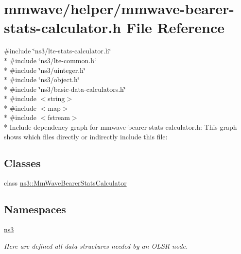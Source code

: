 \hypertarget{mmwave-bearer-stats-calculator_8h}{}\section{mmwave/helper/mmwave-\/bearer-\/stats-\/calculator.h File Reference}
\label{mmwave-bearer-stats-calculator_8h}
{\ttfamily \#include \char`\"{}ns3/lte-\/stats-\/calculator.\+h\char`\"{}}\\*
{\ttfamily \#include \char`\"{}ns3/lte-\/common.\+h\char`\"{}}\\*
{\ttfamily \#include \char`\"{}ns3/uinteger.\+h\char`\"{}}\\*
{\ttfamily \#include \char`\"{}ns3/object.\+h\char`\"{}}\\*
{\ttfamily \#include \char`\"{}ns3/basic-\/data-\/calculators.\+h\char`\"{}}\\*
{\ttfamily \#include $<$string$>$}\\*
{\ttfamily \#include $<$map$>$}\\*
{\ttfamily \#include $<$fstream$>$}\\*
Include dependency graph for mmwave-\/bearer-\/stats-\/calculator.h\+:
This graph shows which files directly or indirectly include this file\+:
\subsection*{Classes}
\begin{DoxyCompactItemize}
\item 
class \hyperlink{classns3_1_1MmWaveBearerStatsCalculator}{ns3\+::\+Mm\+Wave\+Bearer\+Stats\+Calculator}
\end{DoxyCompactItemize}
\subsection*{Namespaces}
\begin{DoxyCompactItemize}
\item 
 \hyperlink{namespacens3}{ns3}
\begin{DoxyCompactList}\small\item\em Here are defined all data structures needed by an O\+L\+SR node. \end{DoxyCompactList}\end{DoxyCompactItemize}
